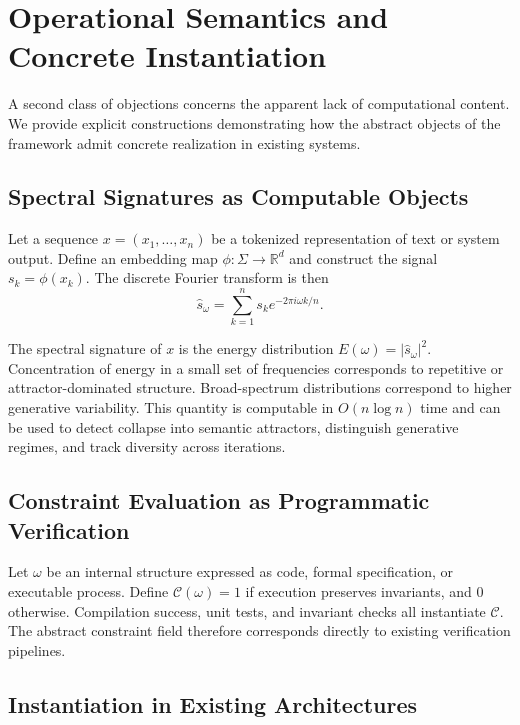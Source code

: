 \documentclass[12pt, a4paper]{article}
\theoremstyle{plain}
\theoremstyle{definition}
\theoremstyle{remark}
\begin{document}
\section{Operational Semantics and Concrete Instantiation}

A second class of objections concerns the apparent lack of computational content. We provide explicit constructions demonstrating how the abstract objects of the framework admit concrete realization in existing systems.

\subsection{Spectral Signatures as Computable Objects}

Let a sequence $x = (x_1, \dots, x_n)$ be a tokenized representation of text or system output. Define an embedding map $\phi : \Sigma \to \mathbb{R}^d$ and construct the signal $s_k = \phi(x_k)$. The discrete Fourier transform is then
\[
\hat{s}_\omega = \sum_{k=1}^n s_k e^{-2\pi i \omega k / n}.
\]

The spectral signature of $x$ is the energy distribution $E(\omega) = |\hat{s}_\omega|^2$. Concentration of energy in a small set of frequencies corresponds to repetitive or attractor-dominated structure. Broad-spectrum distributions correspond to higher generative variability. This quantity is computable in $O(n \log n)$ time and can be used to detect collapse into semantic attractors, distinguish generative regimes, and track diversity across iterations.

\subsection{Constraint Evaluation as Programmatic Verification}

Let $\omega$ be an internal structure expressed as code, formal specification, or executable process. Define $\mathcal{C}(\omega) = 1$ if execution preserves invariants, and $0$ otherwise. Compilation success, unit tests, and invariant checks all instantiate $\mathcal{C}$. The abstract constraint field therefore corresponds directly to existing verification pipelines.

\subsection{Instantiation in Existing Architectures}
\end{document}
